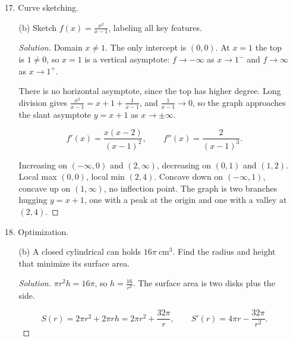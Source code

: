 \documentclass[12pt]{article}
\newenvironment{solution}
  {\renewcommand\qedsymbol{$\blacksquare$}\begin{proof}[Solution]}
  {\end{proof}}
\begin{document}
\begin{enumerate}
\begin{enumerate}
\begin{solution}
$f'$ changes from $+$ to $-$ at $1$: local max $f(1) = 5$. From $-$ to $+$ at $3$: local min $f(3) = 1$.

$f''(x) = 6x - 12$: concave down on $(-\infty,2)$, concave up on $(2,\infty)$, inflection point $(2,3)$. The inflection point sits halfway between the max and min, as for every cubic.
\end{solution}
\end{enumerate}
\item[17.] Curve sketching.
\begin{enumerate}
\item[(b)] Sketch $f(x) = \frac{x^2}{x-1}$, labeling all key features.
\begin{solution}
Domain $x \ne 1$. The only intercept is $(0,0)$. At $x=1$ the top is $1 \ne 0$, so $x = 1$ is a vertical asymptote: $f\to-\infty$ as $x\to1^-$ and $f\to\infty$ as $x\to1^+$.

There is no horizontal asymptote, since the top has higher degree. Long division gives $\frac{x^2}{x-1} = x + 1 + \frac{1}{x-1}$, and $\frac{1}{x-1}\to0$, so the graph approaches the slant asymptote $y = x+1$ as $x \to \pm\infty$.

\[f'(x) = \frac{x(x-2)}{(x-1)^2}, \qquad f''(x) = \frac{2}{(x-1)^3}.\]

Increasing on $(-\infty,0)$ and $(2,\infty)$, decreasing on $(0,1)$ and $(1,2)$. Local max $(0,0)$, local min $(2,4)$. Concave down on $(-\infty,1)$, concave up on $(1,\infty)$, no inflection point. The graph is two branches hugging $y = x+1$, one with a peak at the origin and one with a valley at $(2,4)$.
\end{solution}
\end{enumerate}
\item[18.] Optimization.
\begin{enumerate}
\item[(b)] A closed cylindrical can holds $16\pi\ \text{cm}^3$. Find the radius and height that minimize its surface area.
\begin{solution}
$\pi r^2 h = 16\pi$, so $h = \frac{16}{r^2}$. The surface area is two disks plus the side.

\[S(r) = 2\pi r^2 + 2\pi r h = 2\pi r^2 + \frac{32\pi}{r}, \qquad S'(r) = 4\pi r - \frac{32\pi}{r^2}.\]


\end{solution}
\end{enumerate}
\end{enumerate}
\end{document}
